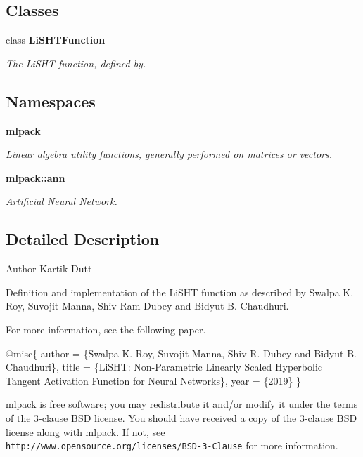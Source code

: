 \subsection*{Classes}
\begin{DoxyCompactItemize}
\item 
class \textbf{ Li\+S\+H\+T\+Function}
\begin{DoxyCompactList}\small\item\em The Li\+S\+HT function, defined by. \end{DoxyCompactList}\end{DoxyCompactItemize}
\subsection*{Namespaces}
\begin{DoxyCompactItemize}
\item 
 \textbf{ mlpack}
\begin{DoxyCompactList}\small\item\em Linear algebra utility functions, generally performed on matrices or vectors. \end{DoxyCompactList}\item 
 \textbf{ mlpack\+::ann}
\begin{DoxyCompactList}\small\item\em Artificial Neural Network. \end{DoxyCompactList}\end{DoxyCompactItemize}


\subsection{Detailed Description}
\begin{DoxyAuthor}{Author}
Kartik Dutt
\end{DoxyAuthor}
Definition and implementation of the Li\+S\+HT function as described by Swalpa K. Roy, Suvojit Manna, Shiv Ram Dubey and Bidyut B. Chaudhuri.

For more information, see the following paper.


\begin{DoxyCode}
@misc\{
  author = \{Swalpa K. Roy, Suvojit Manna, Shiv R. Dubey and
           Bidyut B. Chaudhuri\},
  title = \{LiSHT: Non-Parametric Linearly Scaled Hyperbolic Tangent
          Activation Function \textcolor{keywordflow}{for} Neural Networks\},
  year = \{2019\}
\}
\end{DoxyCode}


mlpack is free software; you may redistribute it and/or modify it under the terms of the 3-\/clause B\+SD license. You should have received a copy of the 3-\/clause B\+SD license along with mlpack. If not, see {\tt http\+://www.\+opensource.\+org/licenses/\+B\+S\+D-\/3-\/\+Clause} for more information. 